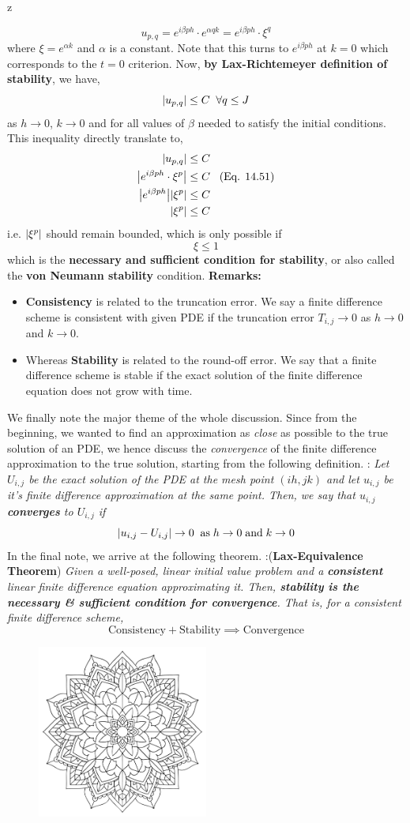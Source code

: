 z\documentclass[a4paper,12pt,twoside]{book}
\newcommand{\nll}[0]{\newline\newline}
\newcommand{\tit}[1]{\textit{#1}}
\newcommand{\theor}[1]{\boxed{\textbf{\textit{Theorem \thechapter.#1}}}}
\newcommand{\defin}[0]{\boxed{\textbf{\textit{Definition}}}}
\DeclarePairedDelimiter\abs{\lvert}{\rvert}
\newcommand{\chapterendsymbol}{
	\par
	\vspace{\stretch{1}}
	\begin{figure}[htbp]
	\begin{center}
		\includegraphics[width=0.5\textwidth]{BookEnd.pdf}
	\end{center}
\end{figure}
	\vspace{\stretch{2}}
}
\begin{document}
\begin{equation}
	u_{p,q} = e^{i\beta ph} \cdot e^{\alpha qk} = e^{i\beta ph}\cdot \xi^q
\end{equation}
where $\boxed{\xi = e^{\alpha k}}$ and $\alpha$ is a constant. Note that this turns to $e^{i\beta ph}$ at $k=0$ which corresponds to the $t=0$ criterion.
\nll
Now,\textbf{ by Lax-Richtemeyer definition of stability}, we have,
\[\abs*{u_{p,q}} \le C\;\;\forall q\le J\]
as $h\to0$, $k\to 0$ and for all values of $\beta$ needed to satisfy the initial conditions. This inequality directly translate to,
\begin{equation}
	\begin{split}
		\abs*{u_{p,q}} &\le C\\
		\abs*{e^{i\beta ph}\cdot \xi^p} &\le C \;\;\;\text{(Eq. 14.51)}\\
		\abs*{e^{i\beta ph}}\abs*{\xi^p} &\le C\\
		\abs*{\xi^p} &\le C
	\end{split}
\end{equation}
i.e. $\abs{\xi^p}$ should remain bounded, which is only possible if
\begin{equation}
	\boxed{\xi\le 1}
\end{equation}
which is the \textbf{necessary and sufficient condition for stability}, or also called the \textbf{von Neumann stability} condition.
\nll
\textbf{Remarks:}
\begin{itemize}
	\item{\textbf{Consistency} is related to the truncation error. We say a finite difference scheme is consistent with given PDE if the truncation error $T_{i,j}\to 0$ as $h\to 0$ and $k\to 0$.}
	\item{Whereas \textbf{Stability} is related to the round-off error. We say that a finite difference scheme is stable if the exact solution of the finite difference equation does not grow with time.}
\end{itemize}
We finally note the major theme of the whole discussion. Since from the beginning, we wanted to find an approximation as \textit{close} as possible to the true solution of an PDE, we hence discuss the \tit{convergence} of the finite difference approximation to the true solution, starting from the following definition.
\nll
\defin\; : \textit{Let $U_{i,j}$ be the exact solution of the PDE at the mesh point $(ih,jk)$ and let $u_{i,j}$ be it's finite difference approximation at the same point. Then, we say that $u_{i,j}$ \textbf{converges} to $U_{i,j}$ if
\[\abs*{u_{i,j} - U_{i,j}} \to 0\;\;\text{as}\;h\to 0 \;\text{and}\;k\to 0\]
}
In the final note, we arrive at the following theorem.
\nll
\theor{16} :\;(\textbf{Lax-Equivalence Theorem}) \textit{Given a well-posed, linear initial value problem and a \textbf{consistent} linear finite difference equation approximating it. Then, \textbf{stability is the necessary \& sufficient condition for convergence}. That is, for a consistent finite difference scheme,
\[\text{Consistency} + \text{Stability} \implies \text{Convergence}\]
}
\newpage
\thispagestyle{empty}
\chapterendsymbol
\end{document}
